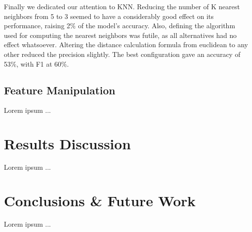 \documentclass[conference]{IEEEtran}
\begin{document}
Finally we dedicated our attention to KNN.
Reducing the number of K nearest neighbors from 5 to 3 seemed to have a considerably
good effect on its performance, raising 2\% of the model's accuracy.
Also, defining the algorithm used for computing the nearest neighbors was futile,
as all alternatives had no effect whatsoever.
Altering the distance calculation formula from euclidean to any other reduced 
the precision slightly.
The best configuration gave an accuracy of 53\%, with F1 at 60\%.

\subsection{Feature Manipulation}

Lorem ipsum ...

\section{Results Discussion}

Lorem ipsum ...

\section{Conclusions \& Future Work}

Lorem ipsum ...





\end{document}
